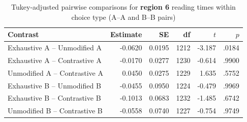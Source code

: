 \documentclass[a4paper, ruler]{CUP-JNL-LIN}%
\begin{document}



\begin{table}[htbp]
\centering
\caption{Tukey-adjusted pairwise comparisons for \textbf{region 6} reading times within choice type (A--A and B--B pairs)}
\label{tab:r6-pairwise-within-choice}
\begin{tabularx}{\textwidth}{@{}Xrrrrr@{}}
\toprule
Contrast & Estimate & SE & df & $t$ & $p$ \\
\midrule
Exhaustive A -- Unmodified A   & -0.0620 & 0.0195 & 1212 & -3.187 & .0184 \\
Exhaustive A -- Contrastive A  & -0.0170 & 0.0277 & 1230 & -0.614 & .9900 \\
Unmodified A -- Contrastive A  &  0.0450 & 0.0275 & 1229 &  1.635 & .5752 \\
Exhaustive B -- Unmodified B   & -0.0455 & 0.0950 & 1224 & -0.479 & .9969 \\
Exhaustive B -- Contrastive B  & -0.1013 & 0.0683 & 1232 & -1.485 & .6742 \\
Unmodified B -- Contrastive B  & -0.0558 & 0.0740 & 1227 & -0.754 & .9749 \\
\bottomrule
\end{tabularx}
\end{table}
\end{document}
